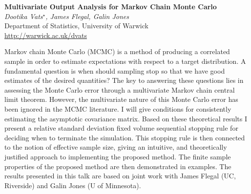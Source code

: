 \documentclass[12pt]{article}
\newcommand{\postertitle}[1]{{\Large\bf #1}\\[12pt]}
\newcommand{\authors}[1]{\emph{#1}\\}
\newcommand{\affiliations}[1]{{#1}\\}
\newcommand{\contacts}[1]{{#1}}
\begin{document}
\begin{center}
\vspace*{0.5cm}
%
\postertitle{Multivariate Output Analysis for Markov Chain Monte Carlo}
%
\authors{Dootika Vats$^\star$, James Flegal, Galin Jones} %
% 
\affiliations{Department of Statistics, University of Warwick}
%
\contacts{\url{http://warwick.ac.uk/dvats}} %
%
\vspace*{0.3cm}
\end{center}

Markov chain Monte Carlo (MCMC) is a method of producing a correlated sample in order to estimate expectations with respect to a target distribution. A fundamental question is when should sampling stop so that we have good estimates of the desired quantities? The key to answering these questions lies in assessing the Monte Carlo error through a multivariate Markov chain central limit theorem.  However, the multivariate nature of this Monte Carlo error has been ignored in the MCMC literature.  I will give conditions  for consistently estimating the asymptotic covariance matrix.  Based on these theoretical results I present  a relative standard deviation fixed volume sequential stopping rule for deciding when to terminate the simulation.  This stopping rule is then connected to the notion of effective sample size, giving an intuitive, and theoretically justified approach to implementing the proposed method.  The finite sample properties of the proposed method are then demonstrated in examples. The results presented in this talk are based on joint work with James Flegal (UC, Riverside) and Galin Jones (U of Minnesota).



\end{document}
